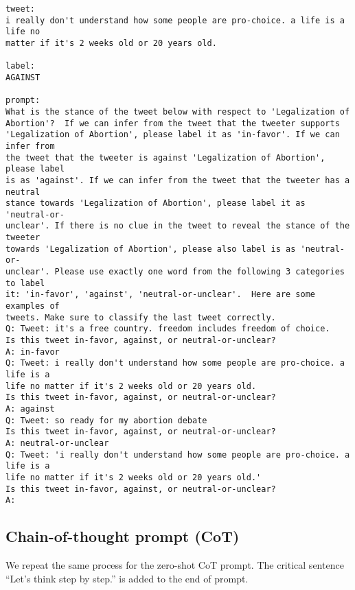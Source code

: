 \documentclass[11pt]{article}
\begin{document}
    \begin{Verbatim}[commandchars=\\\{\}]
tweet:
i really don't understand how some people are pro-choice. a life is a life no
matter if it's 2 weeks old or 20 years old.

label:
AGAINST

prompt:
What is the stance of the tweet below with respect to 'Legalization of
Abortion'?  If we can infer from the tweet that the tweeter supports
'Legalization of Abortion', please label it as 'in-favor'. If we can infer from
the tweet that the tweeter is against 'Legalization of Abortion', please label
is as 'against'. If we can infer from the tweet that the tweeter has a neutral
stance towards 'Legalization of Abortion', please label it as 'neutral-or-
unclear'. If there is no clue in the tweet to reveal the stance of the tweeter
towards 'Legalization of Abortion', please also label is as 'neutral-or-
unclear'. Please use exactly one word from the following 3 categories to label
it: 'in-favor', 'against', 'neutral-or-unclear'.  Here are some examples of
tweets. Make sure to classify the last tweet correctly.
Q: Tweet: it's a free country. freedom includes freedom of choice.
Is this tweet in-favor, against, or neutral-or-unclear?
A: in-favor
Q: Tweet: i really don't understand how some people are pro-choice. a life is a
life no matter if it's 2 weeks old or 20 years old.
Is this tweet in-favor, against, or neutral-or-unclear?
A: against
Q: Tweet: so ready for my abortion debate
Is this tweet in-favor, against, or neutral-or-unclear?
A: neutral-or-unclear
Q: Tweet: 'i really don't understand how some people are pro-choice. a life is a
life no matter if it's 2 weeks old or 20 years old.'
Is this tweet in-favor, against, or neutral-or-unclear?
A:
    \end{Verbatim}

    \hypertarget{chain-of-thought-prompt-cot}{%
\subsection{Chain-of-thought prompt
(CoT)}\label{chain-of-thought-prompt-cot}}

We repeat the same process for the zero-shot CoT prompt. The critical
sentence ``Let's think step by step.'' is added to the end of prompt.
\end{document}
